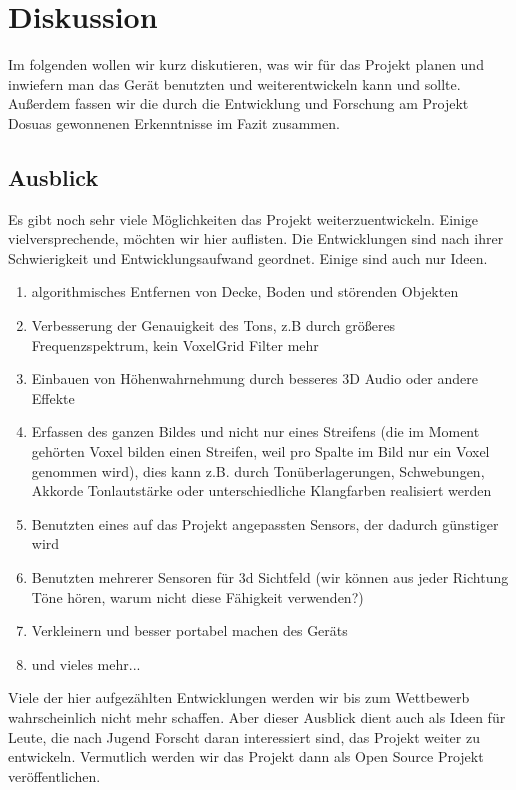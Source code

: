 \documentclass[a4paper,12pt,ngerman]{scrartcl}
\begin{document}
\newpage

\section{Diskussion}

Im folgenden wollen wir kurz diskutieren, was wir für das Projekt planen und inwiefern man das
Gerät benutzten und weiterentwickeln kann und sollte. Außerdem fassen wir die durch die Entwicklung und Forschung am Projekt Dosuas gewonnenen Erkenntnisse im Fazit zusammen. 

\subsection{Ausblick}

Es gibt noch sehr viele Möglichkeiten das Projekt weiterzuentwickeln. Einige vielversprechende,
möchten wir hier auflisten. Die Entwicklungen sind nach ihrer Schwierigkeit und Entwicklungsaufwand geordnet. Einige sind auch nur Ideen.
\begin{enumerate}
	\item algorithmisches Entfernen von Decke, Boden und störenden Objekten
	\item Verbesserung der Genauigkeit des Tons, z.B durch größeres Frequenzspektrum, kein 
	VoxelGrid Filter mehr
	\item Einbauen von Höhenwahrnehmung durch besseres 3D Audio oder andere Effekte
	\item Erfassen des ganzen Bildes und nicht nur eines Streifens (die im Moment gehörten
	Voxel bilden einen Streifen, weil pro Spalte im Bild nur ein Voxel genommen wird), dies
	kann z.B. durch Tonüberlagerungen, Schwebungen, Akkorde Tonlautstärke oder unterschiedliche
	Klangfarben realisiert werden
	\item Benutzten eines auf das Projekt angepassten Sensors, der dadurch günstiger wird
	\item Benutzten mehrerer Sensoren für 3d Sichtfeld (wir können aus jeder Richtung Töne hören,
	warum nicht diese Fähigkeit verwenden?)
	\item Verkleinern und besser portabel machen des Geräts 
	\item und vieles mehr...
\end{enumerate}
Viele der hier aufgezählten Entwicklungen werden wir bis zum Wettbewerb wahrscheinlich nicht 
mehr schaffen. Aber dieser Ausblick dient auch als Ideen für Leute, die nach Jugend Forscht 
daran interessiert sind, das Projekt weiter zu entwickeln. Vermutlich werden wir das Projekt
dann als Open Source Projekt veröffentlichen.
\end{document}
